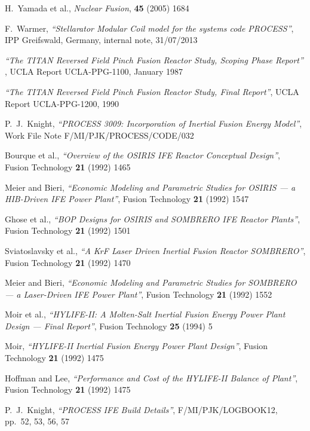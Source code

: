\documentclass[11pt,a4paper]{report}
\begin{document}
\begin{thebibliography}{99}
H.\ Yamada et al.,
\textit{Nuclear Fusion}, \textbf{45} (2005) 1684

F.\ Warmer,
\textit{``Stellarator Modular Coil model for the systems code PROCESS''},
IPP Greifswald, Germany, internal note, 31/07/2013

\textit{``The TITAN Reversed Field Pinch Fusion Reactor Study, Scoping Phase
Report''} ,
UCLA Report UCLA-PPG-1100, January 1987

\textit{``The TITAN Reversed Field Pinch Fusion Reactor Study, Final Report''},
UCLA Report UCLA-PPG-1200, 1990

P.\ J.\ Knight,
\textit{``PROCESS 3009: Incorporation of Inertial Fusion Energy Model''},
Work File Note F/MI/PJK/PROCESS/CODE/032

Bourque et al.,
\textit{``Overview of the OSIRIS IFE Reactor Conceptual Design''},
Fusion Technology \textbf{21} (1992) 1465

Meier and Bieri,
\textit{``Economic Modeling and Parametric Studies for OSIRIS --- a HIB-Driven
  IFE Power Plant''},
Fusion Technology \textbf{21} (1992) 1547

Ghose et al.,
\textit{``BOP Designs for OSIRIS and SOMBRERO IFE Reactor Plants''},
Fusion Technology \textbf{21} (1992) 1501

Sviatoslavsky et al.,
\textit{``A KrF Laser Driven Inertial Fusion Reactor SOMBRERO''},
Fusion Technology \textbf{21} (1992) 1470

Meier and Bieri,
\textit{``Economic Modeling and Parametric Studies for SOMBRERO --- a Laser-Driven
  IFE Power Plant''},
Fusion Technology \textbf{21} (1992) 1552

Moir et al.,
\textit{``HYLIFE-II: A Molten-Salt Inertial Fusion Energy Power Plant Design
  --- Final Report''},
Fusion Technology \textbf{25} (1994) 5

Moir,
\textit{``HYLIFE-II Inertial Fusion Energy Power Plant Design''},
Fusion Technology \textbf{21} (1992) 1475

Hoffman and Lee,
\textit{``Performance and Cost of the HYLIFE-II Balance of Plant''},
Fusion Technology \textbf{21} (1992) 1475

P.\ J.\ Knight,
\textit{``PROCESS IFE Build Details''},
F/MI/PJK/LOGBOOK12, pp.\ 52, 53, 56, 57


\end{thebibliography}
\end{document}
